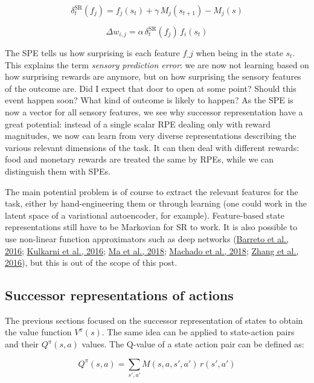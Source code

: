 \documentclass[
  11pt,
]{article}
\begin{document}
\[
    \delta^\text{SR}_t(f_j) = f_j(s_t) + \gamma \, M_j(s_{t+1}) - M_j(s)
\]

\[
    \Delta w_{i, j} = \alpha \, \delta^\text{SR}_t(f_j) \, f_i(s_t)
\]

The SPE tells us how surprising is each feature \(f\_j\) when being in
the state \(s_t\). This explains the term \emph{sensory prediction
error}: we are now not learning based on how surprising rewards are
anymore, but on how surprising the sensory features of the outcome are.
Did I expect that door to open at some point? Should this event happen
soon? What kind of outcome is likely to happen? As the SPE is now a
vector for all sensory features, we see why successor representation
have a great potential: instead of a single scalar RPE dealing only with
reward magnitudes, we now can learn from very diverse representations
describing the various relevant dimensions of the task. It can then deal
with different rewards: food and monetary rewards are treated the same
by RPEs, while we can distinguish them with SPEs.

The main potential problem is of course to extract the relevant features
for the task, either by hand-engineering them or through learning (one
could work in the latent space of a variational autoencoder, for
example). Feature-based state representations still have to be Markovian
for SR to work. It is also possible to use non-linear function
approximators such as deep networks
(\protect\hyperlink{ref-Barreto2016}{Barreto et al., 2016};
\protect\hyperlink{ref-Kulkarni2016}{Kulkarni et al., 2016};
\protect\hyperlink{ref-Ma2018}{Ma et al., 2018};
\protect\hyperlink{ref-Machado2018}{Machado et al., 2018};
\protect\hyperlink{ref-Zhang2016}{Zhang et al., 2016}), but this is out
of the scope of this post.

\hypertarget{successor-representations-of-actions}{%
\subsection{Successor representations of
actions}\label{successor-representations-of-actions}}

The previous sections focused on the successor representation of states
to obtain the value function \(V^\pi(s)\). The same idea can be applied
to state-action pairs and their \(Q^\pi(s, a)\) values. The Q-value of a
state action pair can be defined as:

\[
    Q^\pi(s, a) = \sum_{s', a'} M(s, a, s', a') \, r(s', a')
\]
\end{document}
